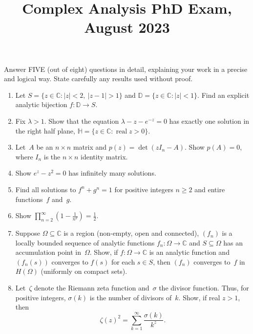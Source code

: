 \documentclass[11pt,letterpaper]{article}
\title{Complex Analysis PhD Exam, August 2023}
\author{}
\date{}
\newenvironment{examproblems}[2]{%
  \def\ProblemHeadingTag{#2}%
  \AssignTaggingSocketPlug{block/list/label}{examproblem}%
  \begin{enumerate}%
  \setcounter{enumi}{#1}%
  \renewcommand{\labelenumi}{\textbf{\theenumi.}}%
  \setlength{\topsep}{0.35em}%
  \setlength{\partopsep}{0pt}%
  \setlength{\itemsep}{0.48em}%
  \setlength{\parsep}{0.18em}%
}{\end{enumerate}}
\newenvironment{examinstructions}{%
  \par\begingroup\itshape
}{%
  \par\endgroup\vspace{0.18em}
}
\begin{document}
\maketitle
\thispagestyle{empty}
\begin{examinstructions}
Answer FIVE (out of eight) questions in detail, explaining your work in a precise and logical way. State carefully any results used without proof.
\end{examinstructions}
\begin{examproblems}{0}{H2}
\def\ProblemHeadingText{Problem 1.}
\item
Let \(S=\{z\in\mathbb{C}:|z|<2,\ |z-1|>1\}\) and \(\mathbb{D}=\{z\in\mathbb{C}:|z|<1\}\). Find an explicit analytic bijection \(f:\mathbb{D}\to S\).
\def\ProblemHeadingText{Problem 2.}
\item
Fix \(\lambda>1\). Show that the equation \(\lambda-z-e^{-z}=0\) has exactly one solution in the right half plane, \(\mathbb{H}=\{z\in\mathbb{C}:\operatorname{real} z>0\}\).
\def\ProblemHeadingText{Problem 3.}
\item
Let~\(A\) be an \(n\times n\) matrix and \(p(z)=\det(zI_n-A)\). Show \(p(A)=0\), where \(I_n\) is the \(n\times n\) identity matrix.
\def\ProblemHeadingText{Problem 4.}
\item
Show \(e^z-z^2=0\) has infinitely many solutions.
\def\ProblemHeadingText{Problem 5.}
\item
Find all solutions to \(f^n+g^n=1\) for positive integers \(n\geq 2\) and entire functions~\(f\) and~\(g\).
\def\ProblemHeadingText{Problem 6.}
\item
Show \(\displaystyle\prod_{n=2}^{\infty}\left(1-\frac{1}{n^2}\right)=\frac{1}{2}\).
\def\ProblemHeadingText{Problem 7.}
\item
Suppose \(\Omega\subseteq\mathbb{C}\) is a region (non-empty, open and connected), \((f_n)\) is a locally bounded sequence of analytic functions \(f_n:\Omega\to\mathbb{C}\) and \(S\subseteq\Omega\) has an accumulation point in~\(\Omega\). Show, if \(f:\Omega\to\mathbb{C}\) is an analytic function and \((f_n(s))\) converges to \(f(s)\) for each \(s\in S\), then \((f_n)\) converges to~\(f\) in \(H(\Omega)\) (uniformly on compact sets).
\def\ProblemHeadingText{Problem 8.}
\item
Let~\(\zeta\) denote the Riemann zeta function and~\(\sigma\) the divisor function. Thus, for positive integers, \(\sigma(k)\) is the number of divisors of~\(k\). Show, if real \(z>1\), then
\[
\zeta(z)^2=\sum_{k=1}^{\infty}\frac{\sigma(k)}{k^z}.
\]
\end{examproblems}
\end{document}
